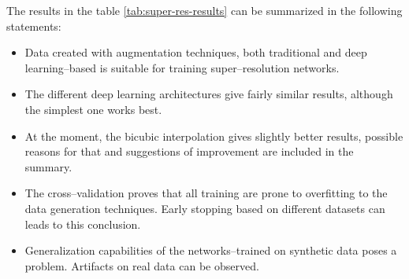 The results in the table \ref{tab:super-res-results} can be summarized in the following statements:
\begin{itemize}
	\item Data created with augmentation techniques, both traditional and deep learning--based is suitable for training super--resolution networks.
	\item The different deep learning architectures give fairly similar results, although the simplest one works best.
	\item At the moment, the bicubic interpolation gives slightly better results, possible reasons for that and suggestions of improvement are included in the summary.
	\item The cross--validation proves that all training are prone to overfitting to the data generation techniques. Early stopping based on different datasets can leads to this conclusion.
	\item Generalization capabilities of the networks--trained on synthetic data poses a problem. Artifacts on real data can be observed.
\end{itemize}